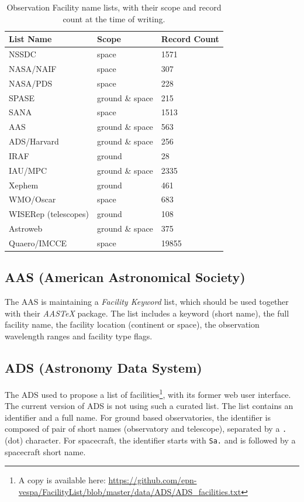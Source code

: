 \documentclass[11pt,a4paper]{ivoa}
\begin{document}
\begin{table}
\caption{Observation Facility name lists, with their scope and record
count at the time of writing.}\label{tab:lists}
\begin{tabular}{lll}
List Name               & Scope           & Record Count \\
\hline
NSSDC                   &           space & 1571 \\
NASA/NAIF               &           space & 307 \\
NASA/PDS                &           space & 228 \\
SPASE                   & ground \& space & 215 \\
SANA                    &           space & 1513 \\
AAS                     & ground \& space & 563 \\
ADS/Harvard             & ground \& space & 256 \\
IRAF                    & ground          & 28 \\
IAU/MPC                 & ground \& space & 2335 \\
Xephem                  & ground          & 461 \\
WMO/Oscar               &           space & 683 \\
WISERep (telescopes)    & ground          & 108 \\
Astroweb                & ground \& space & 375 \\
Quaero/IMCCE            &           space & 19855
\end{tabular}
\end{table}


\subsection{AAS (American Astronomical Society)}
The AAS is maintaining a \emph{Facility Keyword} list, which should be used
together with their \emph{AASTeX} package. The list includes a keyword
(short name), the full facility name, the facility location (continent or
space), the observation wavelength ranges and facility type flags.

\subsection{ADS (Astronomy Data System)}
The ADS used to propose a list of facilities\footnote{A copy is available here:
\protect\url{https://github.com/epn-vespa/FacilityList/blob/master/data/ADS/ADS_facilities.txt}},
with its former web user interface. The current version of ADS is not using
such a curated list. The list contains an identifier and a full name. For
ground based observatories, the identifier is composed of pair of
short names (observatory and telescope), separated by a \texttt{.} (dot)
character. For spacecraft, the identifier starts with \texttt{Sa.} and is
followed by a spacecraft short name.
\end{document}
